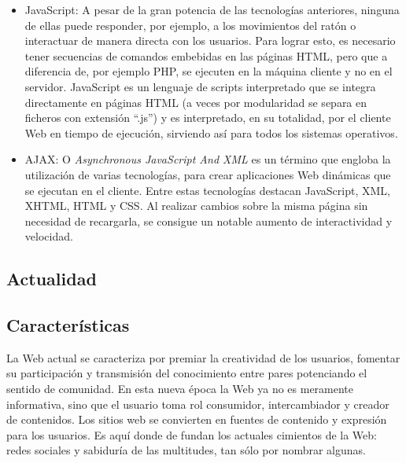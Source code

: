 \begin{itemize}

 \item JavaScript: A pesar de la gran potencia de las tecnologías anteriores, ninguna de ellas 
		   puede responder, por ejemplo, a los movimientos del ratón o interactuar de manera 
		   directa con los usuarios. Para lograr esto, es necesario tener secuencias de comandos 
		   embebidas en las páginas HTML, pero que a diferencia de, por ejemplo PHP,  se ejecuten en 
		   la máquina cliente y no en el servidor. JavaScript es un lenguaje de scripts interpretado 
		   que se integra directamente en páginas HTML (a veces por modularidad se separa en 
		   ficheros con extensión “.js”) y es interpretado, en su totalidad, por el cliente Web 
		   en tiempo de ejecución, sirviendo así para todos los sistemas operativos.
		   
 \item AJAX: O \textit{Asynchronous JavaScript And XML} es un término que engloba la utilización 
	     de varias tecnologías, para crear aplicaciones Web dinámicas que se ejecutan en el cliente. 
	     Entre estas tecnologías destacan JavaScript, XML, XHTML, HTML y CSS. Al realizar cambios 
	     sobre la misma página sin necesidad de recargarla, se consigue un notable aumento de 
	     interactividad y velocidad.
	     
 \end{itemize}


 
\subsection{Actualidad}

\subsection{Características}
 
 La Web actual se caracteriza por premiar la creatividad de los usuarios, fomentar su participación 
y transmisión del conocimiento entre pares potenciando el sentido de comunidad. En esta nueva época 
la Web ya no es meramente informativa, sino que el usuario toma rol consumidor, intercambiador y creador 
de contenidos. Los sitios web se convierten en fuentes de contenido y expresión para los usuarios. Es 
aquí donde de fundan los actuales cimientos de la Web: redes sociales y sabiduría de las multitudes, tan sólo por 
nombrar algunas.

